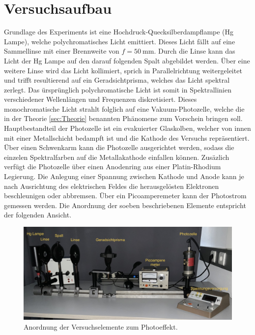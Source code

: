 



\section{Versuchsaufbau}
\label{sec:Versuchsaufbau}

Grundlage des Experiments ist eine Hochdruck-Quecksilberdampflampe (Hg Lampe), welche polychromatisches Licht emittiert. Dieses Licht fällt auf eine
Sammellinse mit einer Brennweite von $f = \qty{50}{\milli\meter}$. Durch die Linse kann das Licht der Hg Lampe auf den darauf folgenden Spalt abgebildet 
werden. Über eine weitere Linse wird das Licht kollimiert, sprich in Parallelrichtung weitergeleitet und trifft resultierend auf ein Geradsichtprisma, 
welches das Licht spektral zerlegt. Das ürsprünglich polychromatische Licht ist somit in Spektrallinien verschiedener Wellenlängen und Frequenzen 
diskretisiert. Dieses monochromatische Licht strahlt folglich auf eine Vakuum-Photozelle, welche die in der Theorie \ref{sec:Theorie} benannten 
Phänomene zum Vorschein bringen soll. Hauptbestandteil der Photozelle ist ein evakuierter Glaskolben, welcher von innen mit einer Metallschicht bedampft
ist und die Kathode des Versuchs repräsentiert. Über einen Schwenkarm kann die Photozelle ausgerichtet werden, sodass die einzelen Spektralfarben auf die 
Metallakathode einfallen können. Zusäzlich verfügt die Photozelle über einen Anodenring aus einer Platin-Rhodium Legierung. Die Anlegung
einer Spannung zwischen Kathode und Anode kann je nach Ausrichtung des elektrischen Feldes die herausgelösten Elektronen beschleunigen oder abbremsen. 
Über ein Picoamperemeter kann der Photostrom gemessen werden. Die Anordnung der soeben beschriebenen Elemente entspricht der folgenden Ansicht.\\

\begin{figure}
    \centering
    \includegraphics[height=5cm]{Anordnung.png}
    \caption{Anordnung der Versuchselemente zum Photoeffekt\cite{Versuchsanleitung_v500}.}
    \label{fig:Anordnung}
\end{figure}


